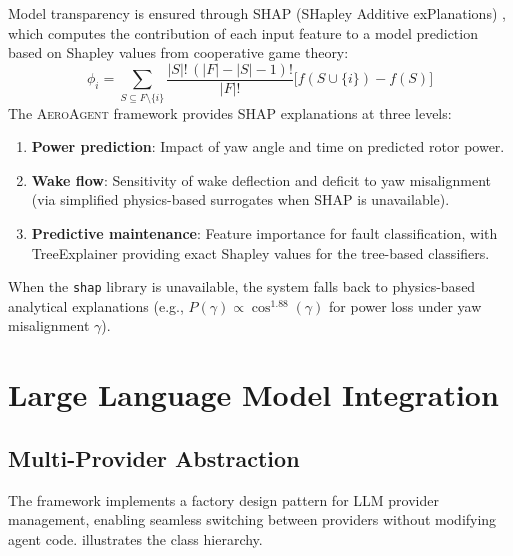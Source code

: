 \documentclass[12pt]{article}
\begin{document}
Model transparency is ensured through SHAP (SHapley Additive exPlanations) \citep{lundberg2017, lundberg2020}, which computes the contribution of each input feature to a model prediction based on Shapley values from cooperative game theory:
\begin{equation}
    \phi_i = \sum_{S \subseteq F \setminus \{i\}} \frac{|S|! \, (|F| - |S| - 1)!}{|F|!} \bigl[f(S \cup \{i\}) - f(S)\bigr]
\end{equation}
The \textsc{AeroAgent} framework provides SHAP explanations at three levels:
\begin{enumerate}[leftmargin=*]
    \item \textbf{Power prediction}: Impact of yaw angle and time on predicted rotor power.
    \item \textbf{Wake flow}: Sensitivity of wake deflection and deficit to yaw misalignment (via simplified physics-based surrogates when SHAP is unavailable).
    \item \textbf{Predictive maintenance}: Feature importance for fault classification, with TreeExplainer providing exact Shapley values for the tree-based classifiers.
\end{enumerate}
When the \texttt{shap} library is unavailable, the system falls back to physics-based analytical explanations (e.g., $P(\gamma) \propto \cos^{1.88}(\gamma)$ for power loss under yaw misalignment $\gamma$).


\section{Large Language Model Integration}
\label{sec:llm_integration}

\subsection{Multi-Provider Abstraction}
\label{sec:llm_factory}

The framework implements a factory design pattern \citep{Gamma1994} for LLM provider management, enabling seamless switching between providers without modifying agent code.
 illustrates the class hierarchy.
\end{document}
